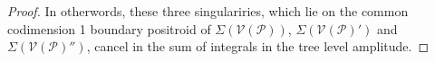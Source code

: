 \documentclass[11pt]{article}
\newcommand{\drawWLD}[2]{

\pgfmathsetmacro{\n}{#1}
\pgfmathsetmacro{\radius}{#2}
\pgfmathsetmacro{\angle}{360/\n}
\draw (0,0) circle (\radius);
    \foreach \i in {1,2,...,\n} {
      \draw (\angle*\i:\radius) node {$\bullet$};
    }

}
\newcommand{\drawprop}[4]{
\pgfmathsetmacro{\r}{#1}
\pgfmathsetmacro{\bumpr}{#2}
\pgfmathsetmacro{\s}{#3}
\pgfmathsetmacro{\bumps}{#4}
\pgfmathsetmacro{\perturbe}{\angle/\n}
\begin{scope}
\draw[smallpropagator] (\angle*\r + \angle/2 + \bumpr*\perturbe:\radius) -- (\angle*\s + \angle/2 + \bumps*\perturbe:\radius);
\end{scope}
}
\newcommand{\modifiedprop}[5]{
\pgfmathsetmacro{\r}{#1}
\pgfmathsetmacro{\bumpr}{#2}
\pgfmathsetmacro{\s}{#3}
\pgfmathsetmacro{\bumps}{#4}
\pgfmathsetmacro{\perturbe}{\angle/\n}

\begin{scope}
\clip (\angle*\r:\radius) -- (\angle + \angle*\r:\radius) -- (\angle*\s:\radius) -- (\angle + \angle*\s:\radius) -- (\angle*\r:\radius);
\draw[#5] (\angle*\r + \angle/2 + \bumpr*\perturbe:\radius) -- (\angle*\s + \angle/2 + \bumps*\perturbe:\radius);
\end{scope}
}
\newcommand{\drawnumbers}{
  \foreach \i in {1,2,...,\n} {
  \pgfmathsetmacro{\x}{\angle*\i}
  \draw (\x:\radius*1.25) node {\footnotesize \i};
}
}
\newcommand{\cP}{\mathcal{P}}
\newcommand{\cV}{\mathcal{V}}
\newcommand{\VP}{\cV(\cP)}
\theoremstyle{remark}
\theoremstyle{definition}
\begin{document}
\begin{proof}
\begin{comment}
        \drawprop{5}{0}{8}{-1}
		\end{scope}
	\end{tikzpicture} \leftrightarrow \begin{tikzpicture}[rotate=67.5,baseline=(current bounding box.east)]
	\begin{scope}
	\drawWLD{10}{1.5}
	\drawnumbers
	\modifiedprop{1}{0}{8}{1}{propagator, dashed}
	\modifiedprop{1}{0}{3}{0}{propagator, dashed}
        \drawprop{5}{0}{8}{-1}
		\end{scope}
	\end{tikzpicture} \leftrightarrow \begin{tikzpicture}[rotate=67.5,baseline=(current bounding box.east)]
	\begin{scope}
	\drawWLD{10}{1.5}
	\drawnumbers
	\modifiedprop{1}{0}{3}{0}{propagator, dashed}
	\modifiedprop{3}{0}{8}{0}{propagator, dashed}
        \drawprop{5}{0}{8}{-1}
		\end{scope}
	\end{tikzpicture}\eas \end{comment}
In otherwords, these three singulariries, which lie on the common codimension 1 boundary positroid of $\Sigma(\VP)$, $\Sigma(\VP')$ and $\Sigma(\VP'')$, cancel in the sum of integrals in the tree level amplitude.


\end{proof}
\end{document}
